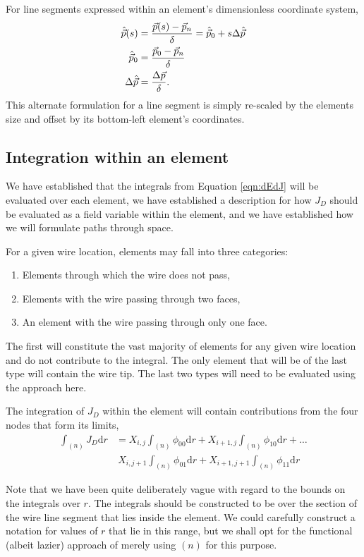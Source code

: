 For line segments expressed within an element's dimensionless coordinate system,
\begin{align}
\hat{\vec{p}}(s) &= \frac{\vec{p}(s) - \vec{p}_n}{\delta} = \hat{\vec{p}}_0 + s\Delta \hat{\vec{p}}\\
\hat{\vec{p}}_0 &= \frac{\vec{p}_0 - \vec{p}_n}{\delta}\nonumber\\
\Delta \hat{\vec{p}} &= \frac{\Delta \vec{p}}{\delta}\nonumber.
\end{align}
This alternate formulation for a line segment is simply re-scaled by the elements size and offset by its bottom-left element's coordinates.

\subsection{Integration within an element}\label{sec:element}

We have established that the integrals from Equation \ref{eqn:dEdJ} will be evaluated over each element, we have established a description for how $J_D$ should be evaluated as a field variable within the element, and we have established how we will formulate paths through space.

For a given wire location, elements may fall into three categories:
\begin{enumerate}
\item Elements through which the wire does not pass,
\item Elements with the wire passing through two faces,
\item An element with the wire passing through only one face.
\end{enumerate}
The first will constitute the vast majority of elements for any given wire location and do not contribute to the integral.  The only element that will be of the last type will contain the wire tip.  The last two types will need to be evaluated using the approach here.

The integration of $J_D$ within the element will contain contributions from the four nodes that form its limits,
\begin{align}
\int_{(n)} J_D \mathrm{d} r &= X_{i,j} \int_{(n)} \phi_{00} \mathrm{d} r + X_{i+1,j} \int_{(n)} \phi_{10} \mathrm{d} r + \ldots \\
&\ X_{i,j+1} \int_{(n)} \phi_{01} \mathrm{d} r + X_{i+1,j+1} \int_{(n)} \phi_{11} \mathrm{d} r \label{eqn:intJD:element}
\end{align}

Note that we have been quite deliberately vague with regard to the bounds on the integrals over $r$.  The integrals should be constructed to be over the section of the wire line segment that lies inside the element.  We could carefully construct a notation for values of $r$ that lie in this range, but we shall opt for the functional (albeit lazier) approach of merely using $(n)$ for this purpose.  

